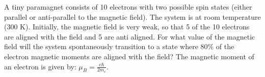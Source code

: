 \question[30] A tiny paramagnet consists of 10 electrons with two possible spin states (either parallel or anti-parallel to the magnetic field). The system is at room temperature (300 K). Initially, the magnetic field is very weak, so that 5 of the 10 electrons are aligned with the field and 5 are anti aligned. For what value of the magnetic field will the system spontaneously transition to a state where 80\% of the electron magnetic moments are aligned with the field? The magnetic moment of an electron is given by: $\mu_B=\frac{e\hbar}{2m_e}$.